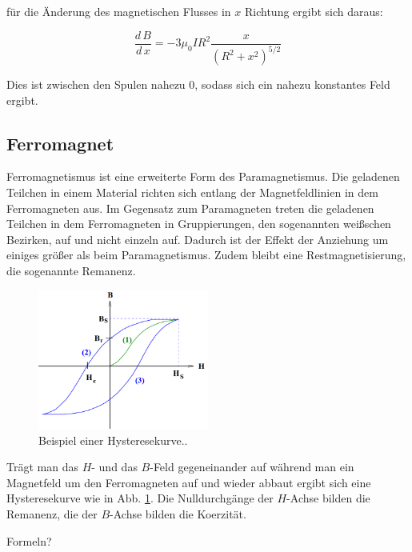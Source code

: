 für die Änderung des magnetischen Flusses in $x$ Richtung ergibt sich daraus:

\begin{equation}
  \frac{d\,B}{d\,x}=-3\mu_0IR^2\frac{x}{\left(R^2+x^2\right)^{5/2}}
  \label{eqn:hh}
\end{equation}

Dies ist zwischen den Spulen nahezu 0, sodass sich ein nahezu konstantes Feld ergibt.

\subsection{Ferromagnet}

Ferromagnetismus ist eine erweiterte Form des Paramagnetismus.
Die geladenen Teilchen in einem Material richten sich entlang der Magnetfeldlinien
in dem Ferromagneten aus. Im Gegensatz zum Paramagneten treten die geladenen
Teilchen in dem Ferromagneten in Gruppierungen, den sogenannten weißschen Bezirken, auf und nicht einzeln auf.
Dadurch ist der Effekt der Anziehung um einiges größer als beim
Paramagnetismus. Zudem bleibt eine Restmagnetisierung, die sogenannte Remanenz.
\begin{figure}
  \centering
  \includegraphics[width=0.5\textwidth]{content/images/Hysterese.png}
  \caption{Beispiel einer Hysteresekurve.\cite{anleitung}.}
  \label{fig:hr}
\end{figure}
Trägt man das $H$- und das $B$-Feld gegeneinander auf während
man ein Magnetfeld um den Ferromagneten auf und wieder abbaut
ergibt sich eine Hysteresekurve wie in Abb. \ref{fig:hr}. Die Nulldurchgänge
der $H$-Achse bilden die Remanenz, die der $B$-Achse bilden die Koerzität.

Formeln?
